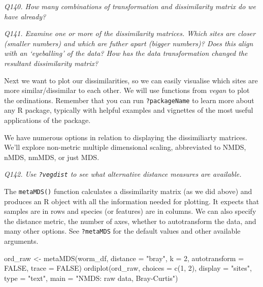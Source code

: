 \documentclass[
  11pt,
  a4paper,
]{book}
\newenvironment{Shaded}{\begin{snugshade}}{\end{snugshade}}
\newcommand{\AttributeTok}[1]{\textcolor[rgb]{0.77,0.63,0.00}{#1}}
\newcommand{\ConstantTok}[1]{\textcolor[rgb]{0.00,0.00,0.00}{#1}}
\newcommand{\DecValTok}[1]{\textcolor[rgb]{0.00,0.00,0.81}{#1}}
\newcommand{\FunctionTok}[1]{\textcolor[rgb]{0.00,0.00,0.00}{#1}}
\newcommand{\NormalTok}[1]{#1}
\newcommand{\OtherTok}[1]{\textcolor[rgb]{0.56,0.35,0.01}{#1}}
\newcommand{\StringTok}[1]{\textcolor[rgb]{0.31,0.60,0.02}{#1}}
\begin{document}
\emph{Q140. How many combinations of transformation and dissimilarity matrix do we have already?}

\emph{Q141. Examine one or more of the dissimilarity matrices. Which sites are closer (smaller numbers) and which are futher apart (bigger numbers)? Does this align with an `eyeballing' of the data? How has the data transformation changed the resultant dissimilarity matrix?}

Next we want to plot our dissimilarities, so we can easily visualise which sites are more similar/dissimilar to each other. We will use functions from \emph{vegan} to plot the ordinations. Remember that you can run \texttt{?packageName} to learn more about any R package, typically with helpful examples and vignettes of the most useful applications of the package.

We have numerous options in relation to displaying the dissimiliarty matrices. We'll explore non-metric multiple dimensional scaling, abbreviated to NMDS, nMDS, nmMDS, or just MDS.

\emph{Q142. Use \texttt{?vegdist} to see what alternative distance measures are available.}

The \texttt{metaMDS()} function calculates a dissimilarity matrix (as we did above) and produces an R object with all the information needed for plotting. It expects that samples are in rows and species (or features) are in columns. We can also specify the distance metric, the number of axes, whether to autotransform the data, and many other options. See \texttt{?metaMDS} for the default values and other available arguments.

\begin{Shaded}
\begin{Highlighting}[]
\NormalTok{ord\_raw }\OtherTok{\textless{}{-}} \FunctionTok{metaMDS}\NormalTok{(worm\_df, }\AttributeTok{distance =} \StringTok{"bray"}\NormalTok{, }\AttributeTok{k =} \DecValTok{2}\NormalTok{,}
                   \AttributeTok{autotransform =} \ConstantTok{FALSE}\NormalTok{, }\AttributeTok{trace =} \ConstantTok{FALSE}\NormalTok{)}
\FunctionTok{ordiplot}\NormalTok{(ord\_raw, }\AttributeTok{choices =} \FunctionTok{c}\NormalTok{(}\DecValTok{1}\NormalTok{, }\DecValTok{2}\NormalTok{), }\AttributeTok{display =} \StringTok{"sites"}\NormalTok{, }
         \AttributeTok{type =} \StringTok{"text"}\NormalTok{, }\AttributeTok{main =} \StringTok{"NMDS: raw data, Bray{-}Curtis"}\NormalTok{)}
\end{Highlighting}
\end{Shaded}
\end{document}
